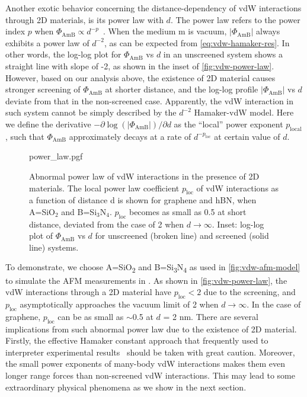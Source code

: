 Another exotic behavior concerning the distance-dependency of vdW
interactions through 2D materials, is its power law with
$d$. 
%
The power law refers to the power index $p$ when
$\Phi_{\mathrm{AmB}} \propto d^{-p}$~\cite{Gobre_2013_ncomm}.
%
When the medium m is vacuum, \(|\Phi_{\mathrm{AmB}}|\) always exhibits a
power law of \(d^{-2}\), as can be expected from
\autoref{eq:vdw-hamaker-res}.
%
In other words, the log-log plot for \(\Phi_{\mathrm{AmB}}\) vs
\(d\) in an unscreened system shows a straight line with slope of -2,
as shown in the inset of \autoref{fig:vdw-power-law}.
%
However, based on our analysis above, the existence of 2D material
causes stronger screening of $\Phi_{\mathrm{AmB}}$ at shorter
distance, and the log-log profile \(|\Phi_{\mathrm{AmB}}|\) vs \(d\)
deviate from that in the non-screened case.
%
Apparently, the vdW interaction in such system cannot be simply
described by the $d^{-2}$ Hamaker-vdW model. Here we define the
derivative $-\partial \log(|\Phi_{\mathrm{AmB}}|)/ \partial d$ as the
``local'' power exponent $p_{\mathrm{local}}$, such that
$\Phi_{\mathrm{AmB}}$ approximately decays at a rate of
$d^{-p_{\mathrm{loc}}}$ at certain value of $d$.
%

\begin{figure}[!htbp]
  \centering{}
  {power_law.pgf}
  \caption{\label{fig:vdw-power-law}%
    Abnormal power law of vdW interactions in the presence of 2D
    materials. The local power law coefficient $p_{\mathrm{loc}}$ of
    vdW interactions as a function of distance d is shown for graphene
    and hBN, when A=SiO$_{2}$ and
    B=Si$_{3}$N$_{4}$. $p_{\mathrm{loc}}$ becomes as small as 0.5 at
    short distance, deviated from the case of 2 when $d \to
    \infty$. Inset: log-log plot of $\Phi_{\mathrm{AmB}}$ vs $d$ for
    unscreened (broken line) and screened (solid line) systems.  }
\end{figure}
To demonstrate, we choose A=SiO\textsubscript{2} and
B=Si\textsubscript{3}N\textsubscript{4} as used in
\autoref{fig:vdw-afm-model} to simulate the AFM measurements in
\cite{Tsoi_2014_vdW_screening_2D}.
%
As shown in \autoref{fig:vdw-power-law}, the vdW interactions through
a 2D material have $p_{\mathrm{loc}} < 2$ due to the screening, and
\(p_{\mathrm{loc}}\) asymptotically approaches the vacuum limit of 2
when $d \to \infty$.
%
In the case of graphene, \(p_{\mathrm{loc}}\) can be as small as
$\sim{}$0.5 at \(d\) = 2 nm.  There are several implications from such
abnormal power law due to the existence of 2D material. Firstly, the
effective Hamaker constant approach that frequently used to
interpreter experimental
results~\cite{Tsoi_2014_vdW_screening_2D,rafiee_2012_transparency}
should be taken with great caution. Moreover, the small power exponents
of many-body vdW interactions makes them even longer range forces than
non-screened vdW interactions. This may lead to some extraordinary
physical phenomena as we show in the next section.

